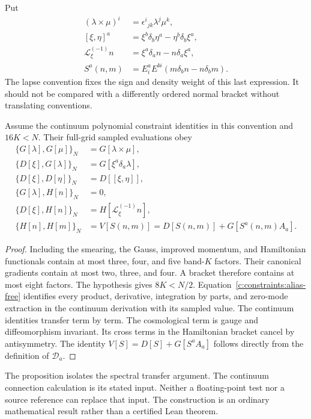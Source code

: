 Put
\begin{align}
 (\lambda\times\mu)^i&=\epsilon^i{}_{jk}\lambda^j\mu^k,\\
 [\xi,\eta]^a&=\xi^b\delta_b\eta^a-\eta^b\delta_b\xi^a,\\
 \mathcal L_\xi^{(-1)}n&=\xi^a\delta_an-n\delta_a\xi^a,\\
 S^a(n,m)&=E^a_iE^{bi}(m\delta_bn-n\delta_bm).
\end{align}
The lapse convention fixes the sign and density weight of this last expression. It should not be compared with a differently ordered normal bracket without translating conventions.

\begin{proposition}
Assume the continuum polynomial constraint identities in this convention and $16K<N$. Their full-grid sampled evaluations obey
\begin{align}
 \{G[\lambda],G[\mu]\}_N&=G[\lambda\times\mu],\\
 \{D[\xi],G[\lambda]\}_N&=G[\xi^a\delta_a\lambda],\\
 \{D[\xi],D[\eta]\}_N&=D[[\xi,\eta]],\\
 \{G[\lambda],H[n]\}_N&=0,\\
 \{D[\xi],H[n]\}_N&=H[\mathcal L_\xi^{(-1)}n],\\
 \{H[n],H[m]\}_N&=V[S(n,m)]
                  =D[S(n,m)]+G[S^a(n,m)A_a].
 \label{c:constraints:resolved-algebra}
\end{align}
\end{proposition}
\begin{proof}
Including the smearing, the Gauss, improved momentum, and Hamiltonian functionals contain at most three, four, and five band-$K$ factors. Their canonical gradients contain at most two, three, and four. A bracket therefore contains at most eight factors. The hypothesis gives $8K<N/2$. Equation~\eqref{c:constraints:alias-free} identifies every product, derivative, integration by parts, and zero-mode extraction in the continuum derivation with its sampled value. The continuum identities transfer term by term. The cosmological term is gauge and diffeomorphism invariant. Its cross terms in the Hamiltonian bracket cancel by antisymmetry. The identity $V[S]=D[S]+G[S^aA_a]$ follows directly from the definition of $\mathcal D_a$.
\end{proof}

The proposition isolates the spectral transfer argument. The continuum connection calculation is its stated input. Neither a floating-point test nor a source reference can replace that input. The construction is an ordinary mathematical result rather than a certified Lean theorem.

